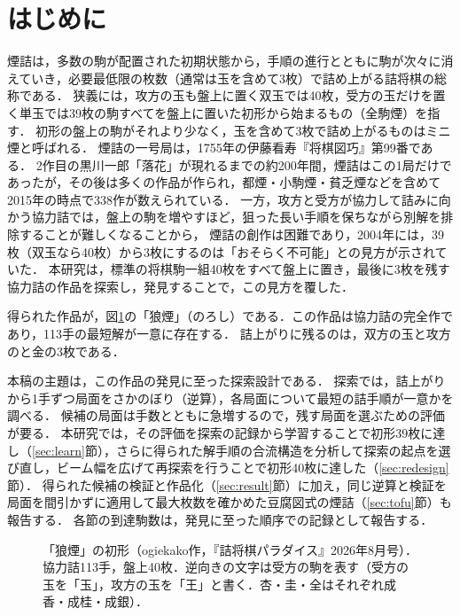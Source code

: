 \documentclass[english,submit]{ipsj}
\begin{document}
\section{はじめに}
煙詰は，多数の駒が配置された初期状態から，手順の進行とともに駒が次々に消えていき，必要最低限の枚数（通常は玉を含めて3枚）で詰め上がる詰将棋の総称である．
狭義には，攻方の玉も盤上に置く双玉では40枚，受方の玉だけを置く単玉では39枚の駒すべてを盤上に置いた初形から始まるもの（全駒煙）を指す．
初形の盤上の駒がそれより少なく，玉を含めて3枚で詰め上がるものはミニ煙と呼ばれる\cite{wikikemuri}．
煙詰の一号局は，1755年の伊藤看寿『将棋図巧』第99番である\cite{zuko}．
2作目の黒川一郎「落花」が現れるまでの約200年間，煙詰はこの1局だけであった\cite{toybox56}が，その後は多くの作品が作られ，都煙・小駒煙・貧乏煙などを含めて2015年の時点で338作が数えられている\cite{tetsu2015}．
一方，攻方と受方が協力して詰みに向かう協力詰では，盤上の駒を増やすほど，狙った長い手順を保ちながら別解を排除することが難しくなることから，
煙詰の創作は困難であり\cite{mozu2004,wfp218}，2004年には，39枚（双玉なら40枚）から3枚にするのは「おそらく不可能」との見方が示されていた\cite{mozu2004}．
本研究は，標準の将棋駒一組40枚をすべて盤上に置き，最後に3枚を残す協力詰の作品を探索し，発見することで，この見方を覆した．

得られた作品が，図\ref{fig:noroshi}の「狼煙」（のろし）である．この作品は協力詰の完全作であり，113手の最短解が一意に存在する．
詰上がりに残るのは，双方の玉と攻方のと金の3枚である．

本稿の主題は，この作品の発見に至った探索設計である．
探索では，詰上がりから1手ずつ局面をさかのぼり（逆算），各局面について最短の詰手順が一意かを調べる．
候補の局面は手数とともに急増するので，残す局面を選ぶための評価が要る．
本研究では，その評価を探索の記録から学習することで初形39枚に達し（\ref{sec:learn}節），さらに得られた解手順の合流構造を分析して探索の起点を選び直し，ビーム幅を広げて再探索を行うことで初形40枚に達した（\ref{sec:redesign}節）．
得られた候補の検証と作品化（\ref{sec:result}節）に加え，同じ逆算と検証を局面を間引かずに適用して最大枚数を確かめた豆腐図式の煙詰（\ref{sec:tofu}節）も報告する．
各節の到達駒数は，発見に至った順序での記録として報告する．

\begin{figure}[t]
\centering

\caption{「狼煙」の初形（ogiekako作，『詰将棋パラダイス』2026年8月号）．協力詰113手，盤上40枚．逆向きの文字は受方の駒を表す（受方の玉を「玉」，攻方の玉を「王」と書く．杏・圭・全はそれぞれ成香・成桂・成銀）．}
\label{fig:noroshi}
\end{figure}
\end{document}
